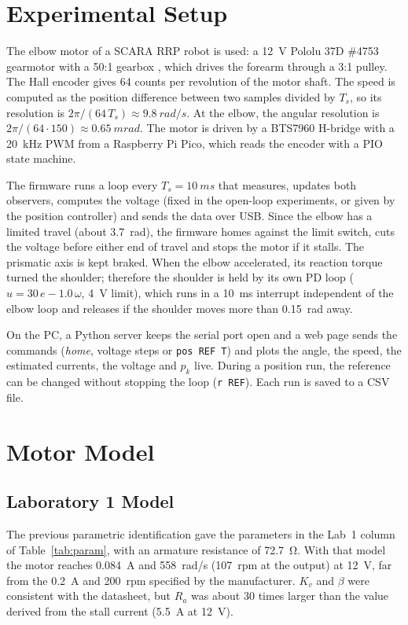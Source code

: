 \documentclass[conference,a4paper]{IEEEtran}
\begin{document}
\section{Experimental Setup}
The elbow motor of a SCARA RRP robot is used: a \SI{12}{V} Pololu 37D \#4753 gearmotor with a 50:1 gearbox \cite{pololu}, which drives the forearm through a 3:1 pulley. The Hall encoder gives 64 counts per revolution of the motor shaft. The speed is computed as the position difference between two samples divided by $T_s$, so its resolution is $2\pi/(64\,T_s)\approx\SI{9.8}{rad/s}$. At the elbow, the angular resolution is $2\pi/(64\cdot150)\approx\SI{0.65}{mrad}$. The motor is driven by a BTS7960 H-bridge with a \SI{20}{kHz} PWM from a Raspberry Pi Pico, which reads the encoder with a PIO state machine.

The firmware runs a loop every $T_s=\SI{10}{ms}$ that measures, updates both observers, computes the voltage (fixed in the open-loop experiments, or given by the position controller) and sends the data over USB. Since the elbow has a limited travel (about \SI{3.7}{rad}), the firmware homes against the limit switch, cuts the voltage before either end of travel and stops the motor if it stalls. The prismatic axis is kept braked. When the elbow accelerated, its reaction torque turned the shoulder; therefore the shoulder is held by its own PD loop ($u=30\,e-1.0\,\omega$, \SI{4}{V} limit), which runs in a \SI{10}{ms} interrupt independent of the elbow loop and releases if the shoulder moves more than \SI{0.15}{rad} away.

On the PC, a Python server keeps the serial port open and a web page sends the commands (\emph{home}, voltage steps or \texttt{pos REF T}) and plots the angle, the speed, the estimated currents, the voltage and $p_k$ live. During a position run, the reference can be changed without stopping the loop (\texttt{r REF}). Each run is saved to a CSV file.

\section{Motor Model}
\subsection{Laboratory 1 Model}
The previous parametric identification gave the parameters in the Lab~1 column of Table~\ref{tab:param}, with an armature resistance of \SI{72.7}{\ohm}. With that model the motor reaches \SI{0.084}{A} and \SI{558}{rad/s} (\SI{107}{rpm} at the output) at \SI{12}{V}, far from the \SI{0.2}{A} and \SI{200}{rpm} specified by the manufacturer. $K_v$ and $\beta$ were consistent with the datasheet, but $R_a$ was about 30 times larger than the value derived from the stall current (\SI{5.5}{A} at \SI{12}{V}).
\end{document}
